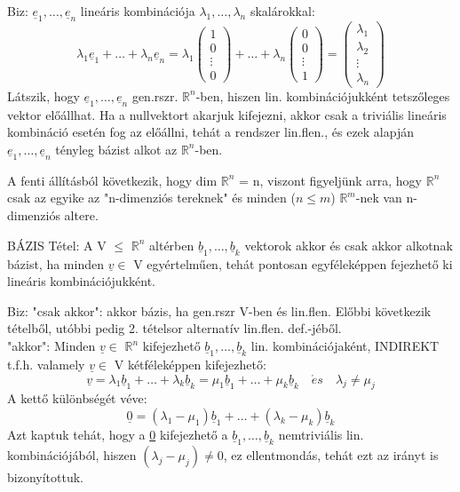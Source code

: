 \documentclass[]{article}
\newcommand{\Rn}[1]{$\mathbb{R}^{#1}$}
\newcommand{\Und}[1]{\underline{#1}}
\begin{document}
\begin{leftbar}
Biz: $\Und{e}_1,\ldots,\Und{e}_n$ lineáris kombinációja $\lambda_1,\ldots,\lambda_n$ skalárokkal:
$$\lambda_1\Und{e}_1+\ldots+\lambda_n\Und{e}_n = \lambda_1\begin{pmatrix}
1\\0\\\vdots\\0
\end{pmatrix}+\ldots+
\lambda_n\begin{pmatrix}
0\\0\\\vdots\\1 
\end{pmatrix} = \begin{pmatrix}
\lambda_1\\\lambda_2\\\vdots\\\lambda_n
\end{pmatrix}$$
Látszik, hogy $\Und{e}_1,\ldots,\Und{e}_n$ gen.rszr. \Rn{n}-ben, hiszen lin. kombinációjukként tetszőleges vektor előállhat. Ha a nullvektort akarjuk kifejezni, akkor csak a triviális lineáris kombináció esetén fog az előállni, tehát a rendszer lin.flen., és ezek alapján $\Und{e}_1,\ldots,\Und{e}_n$ tényleg bázist alkot az \Rn{n}-ben.
\end{leftbar}
A fenti állításból következik, hogy dim \Rn{n} = n, viszont figyeljünk arra, hogy \Rn{n} csak az egyike az "n-dimenziós tereknek" és minden ($n \leq m$) \Rn{m}-nek van n-dimenziós altere.
\begin{framed}
BÁZIS Tétel: A V $\leq$ \Rn{n} altérben $\Und{b}_1,\ldots,\Und{b}_k$ vektorok akkor és csak akkor alkotnak bázist, ha minden $\Und{v} \in$ V egyértelműen, tehát pontosan egyféleképpen fejezhető ki lineáris kombinációjukként.
\end{framed}
\begin{leftbar}
Biz: "csak akkor": akkor bázis, ha gen.rszr V-ben és lin.flen. Előbbi következik tételből, utóbbi pedig 2. tételsor alternatív lin.flen. def.-jéből.\\
"akkor": Minden $\Und{v} \in$ \Rn{n} kifejezhető $\Und{b}_1,\ldots,\Und{b}_k$ lin. kombinációjaként, INDIREKT t.f.h. valamely $\Und{v} \in$ V kétféleképpen kifejezhető: 
$$\Und{v} = \lambda_1\Und{b}_1 + \ldots + \lambda_k\Und{b}_k = \mu_1\Und{b}_1 + \ldots + \mu_k\Und{b}_k\quad \acute{e}s\quad \lambda_j \neq \mu_j$$A kettő különbségét véve:
$$\Und{0} = (\lambda_1 - \mu_1)\Und{b}_1 +\ldots +  (\lambda_k - \mu_k)\Und{b}_k$$
Azt kaptuk tehát, hogy a \Und{0} kifejezhető a $\Und{b}_1,\ldots,\Und{b}_k$ nemtriviális lin. kombinációjából, hiszen $(\lambda_j - \mu_j) \neq 0$, ez ellentmondás, tehát ezt az irányt is bizonyítottuk.
\end{leftbar}
\end{document}
